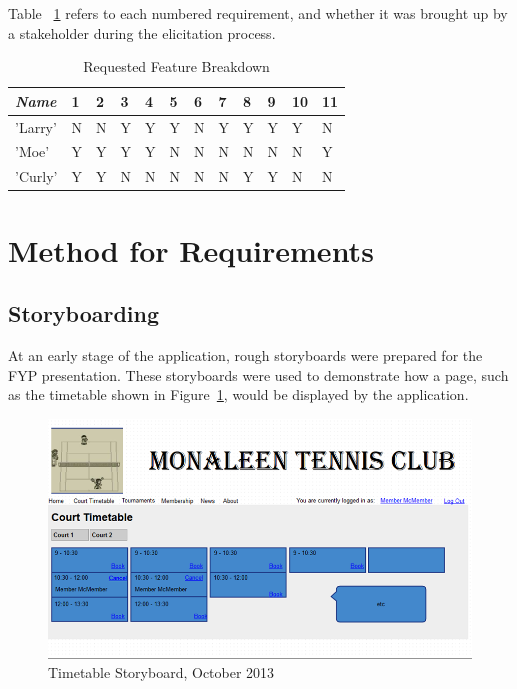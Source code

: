 Table ~\ref{fig:reqbreakdown} refers to each numbered requirement, and whether it was brought up by a stakeholder during the elicitation process.
\begin{table}[H]
\caption{Requested Feature Breakdown}
\begin{center}
    \begin{tabular}{ | l | l | l | l | l| l| l| l| l| l|l| p{.22cm} |}
    \hline
     \textit{Name}& 1& 2 & 3 & 4 & 5 & 6 & 7 & 8 & 9 & 10 & 11\\ \hline
	 'Larry' & N & N & Y & Y & Y & N & Y & Y & Y & Y & N\\ \hline
	  'Moe' & Y & Y & Y & Y & N & N & N & N & N & N & Y\\ \hline
	    'Curly' & Y & Y & N & N & N & N & N & Y & Y & N & N\\ \hline
    \end{tabular}
\end{center}
\label{fig:reqbreakdown}
\end{table}
\section{Method for Requirements}

\subsection{Storyboarding}

At an early stage of the application, rough storyboards were prepared for the FYP presentation. These storyboards were used to demonstrate how a page, such as the timetable shown in Figure~\ref{fig:timetableSB}, would be displayed by the application.

\begin{figure}[H]
\begin{center}
\includegraphics[width=14cm]{storyboard.png}
\end{center}
\caption{Timetable Storyboard, October 2013}
\label{fig:timetableSB}
\end{figure}

